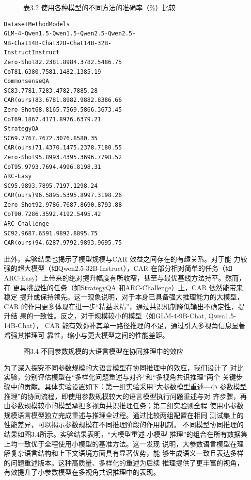 \documentclass[12pt,a4paper,openright,UTF8]{ctexbook}
\begin{document}
\begin{figure}[htbp]
\centering
{}
\caption{表3.2 使用各种模型的不同方法的准确率（\%）比较}
\end{figure}

\begin{lstlisting}
DatasetMethodModels
GLM-4-Qwen1.5-Qwen1.5-Qwen2.5-Qwen2.5-
9B-Chat14B-Chat32B-Chat14B-32B-
InstructInstruct
Zero-Shot82.2381.8984.3782.5486.75
CoT81.6380.7581.1482.1385.19
CommonsenseQA
SC83.7781.7283.4782.7885.28
CAR(ours)83.6781.8982.9882.8386.66
Zero-Shot68.8165.7569.5866.3673.45
CoT69.1867.4171.8976.6379.21
StrategyQA
SC69.7767.7672.3076.8580.35
CAR(ours)71.4370.1475.2378.7180.55
Zero-Shot95.8993.4395.3696.7798.52
CoT95.9793.7694.4996.8198.31
ARC-Easy
SC95.9893.7895.7197.1298.24
CAR(ours)96.5895.5395.8997.3198.26
Zero-Shot92.9786.7687.8690.8793.88
CoT90.7286.3592.4192.5495.42
ARC-Challenge
SC92.9687.6591.9892.8895.75
CAR(ours)94.6287.9792.9893.9695.75
\end{lstlisting}
此外，实验结果也揭示了模型规模与CAR 效益之间存在的有趣关系。对于能 力较强的超大模型（如Qwen2.5-32B-Instruct），CAR 在部分相对简单的任务（如 ARC-Easy）上带来的绝对提升幅度有所收窄，甚至与最优基线方法持平。然而，在 更具挑战性的任务（如StrategyQA 和ARC-Challenge）上，CAR 依然能带来稳定 提升或保持领先。这一现象说明，对于本身已具备强大推理能力的大模型，CAR 的作用更多体现在进一步“精益求精”，通过共识机制降低输出不确定性，提升结 果的一致性。反之，对于规模较小的模型（如GLM-4-9B-Chat, Qwen1.5-14B-Chat）， CAR 能有效弥补其单一路径推理的不足，通过引入多视角信息显著增强其推理可 靠性，缩小与更大模型之间的性能差距。

\begin{figure}[htbp]
\centering
{}
\caption{图3.4 不同参数规模的大语言模型在协同推理中的效应}
\end{figure}

为了深入探究不同参数规模的大语言模型在协同推理中的效应，我们设计了 对比实验，分别评估模型在“多样化问题重述与对齐”和“多视角共识推理”两个 关键步骤中的贡献。具体实验设置如下：第一组实验采用“大参数模型重述—小 参数模型推理”的协同流程，即使用参数规模较大的语言模型执行问题重述与对 齐步骤，再由参数规模较小的模型承担多视角共识推理任务；第二组实验则全程 使用小参数规模语言模型独立完成重述与推理全过程。通过比较两组配置在相同 测试集上的性能差异，可以揭示参数规模在不同推理阶段的作用机制。 不同模型协同推理的结果如图3.4所示。实验结果表明，“大模型重述-小模型 推理”的组合在所有数据集上均一致优于全程使用小模型的基准方法。这一发现 说明，大参数语言模型在理解复杂语言结构和上下文语境方面具有显著优势，能 够生成语义一致且表达多样的问题重述版本。这种高质量、多样化的重述为后续 推理提供了更丰富的视角，有效提升了小参数模型在多视角共识推理中的表现。
\end{document}
